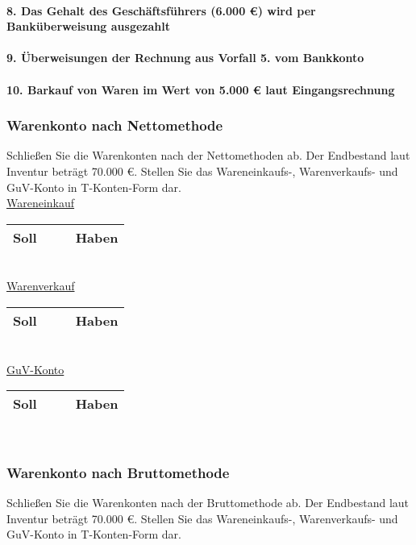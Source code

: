 \documentclass[paper=a4, fontsize=11pt]{scrartcl}
\numberwithin{equation}{section}
\numberwithin{figure}{section}
\numberwithin{table}{section}
\begin{document}
\paragraph{8. Das Gehalt des Geschäftsführers (6.000 €) wird per Banküberweisung ausgezahlt}

\paragraph{9. Überweisungen der Rechnung aus Vorfall 5. vom Bankkonto}

\paragraph{10. Barkauf von Waren im Wert von 5.000 € laut Eingangsrechnung}

\subsubsection{Warenkonto nach Nettomethode}
Schließen Sie die Warenkonten nach der Nettomethoden ab. Der Endbestand laut Inventur beträgt 70.000 €. Stellen Sie das Wareneinkaufs-, Warenverkaufs- und GuV-Konto in T-Konten-Form dar. \\

\underline{Wareneinkauf}

\begin{tabular}{cc|cc}
\hline
Soll & & & Haben \\
\hline
\end{tabular}
\\

\underline{Warenverkauf}

\begin{tabular}{cc|cc}
\hline
Soll & & & Haben \\
\hline
\end{tabular}
\\

\underline{GuV-Konto}

\begin{tabular}{cc|cc}
\hline
Soll & & & Haben \\
\hline
\end{tabular}
\\

\subsubsection{Warenkonto nach Bruttomethode}
Schließen Sie die Warenkonten nach der Bruttomethode ab. Der Endbestand laut Inventur beträgt 70.000 €. Stellen Sie das Wareneinkaufs-, Warenverkaufs- und GuV-Konto in T-Konten-Form dar. \\
\end{document}
